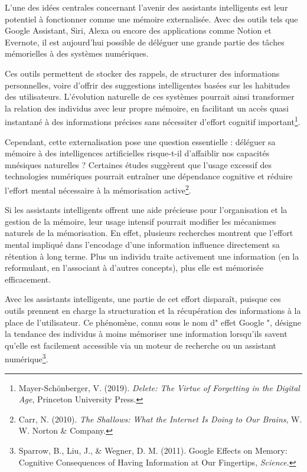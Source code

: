 \documentclass[12pt,a4paper]{report}
\begin{document}
L’une des idées centrales concernant l’avenir des assistants intelligents est leur potentiel à fonctionner comme une mémoire externalisée. Avec des outils tels que Google Assistant, Siri, Alexa ou encore des applications comme Notion et Evernote, il est aujourd’hui possible de déléguer une grande partie des tâches mémorielles à des systèmes numériques.

Ces outils permettent de stocker des rappels, de structurer des informations personnelles, voire d’offrir des suggestions intelligentes basées sur les habitudes des utilisateurs. L’évolution naturelle de ces systèmes pourrait ainsi transformer la relation des individus avec leur propre mémoire, en facilitant un accès quasi instantané à des informations précises sans nécessiter d’effort cognitif important\footnote{Mayer-Schönberger, V. (2019). \textit{Delete: The Virtue of Forgetting in the Digital Age}, Princeton University Press.}.

Cependant, cette externalisation pose une question essentielle : déléguer sa mémoire à des intelligences artificielles risque-t-il d’affaiblir nos capacités mnésiques naturelles ? Certaines études suggèrent que l’usage excessif des technologies numériques pourrait entraîner une dépendance cognitive et réduire l’effort mental nécessaire à la mémorisation active\footnote{Carr, N. (2010). \textit{The Shallows: What the Internet Is Doing to Our Brains}, W. W. Norton \& Company.}.

Si les assistants intelligents offrent une aide précieuse pour l’organisation et la gestion de la mémoire, leur usage intensif pourrait modifier les mécanismes naturels de la mémorisation. En effet, plusieurs recherches montrent que l’effort mental impliqué dans l’encodage d’une information influence directement sa rétention à long terme. Plus un individu traite activement une information (en la reformulant, en l’associant à d’autres concepts), plus elle est mémorisée efficacement.

Avec les assistants intelligents, une partie de cet effort disparaît, puisque ces outils prennent en charge la structuration et la récupération des informations à la place de l’utilisateur. Ce phénomène, connu sous le nom d" effet Google ", désigne la tendance des individus à moins mémoriser une information lorsqu’ils savent qu’elle est facilement accessible via un moteur de recherche ou un assistant numérique\footnote{Sparrow, B., Liu, J., \& Wegner, D. M. (2011). Google Effects on Memory: Cognitive Consequences of Having Information at Our Fingertips, \textit{Science}.}.
\end{document}

